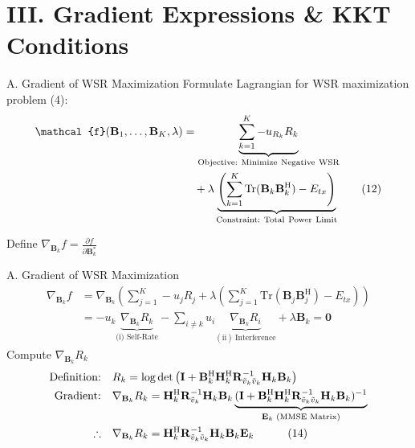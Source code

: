 \documentclass[aspectratio=169, 10pt]{beamer}
\begin{document}
\section{III. Gradient Expressions \& KKT Conditions}

\begin{frame}{A. Gradient of WSR Maximization}
    Formulate Lagrangian for WSR maximization problem (4):
    \begin{align}
        \mathcal{f}(\mathbf{B}_1, \dots, \mathbf{B}_K, \lambda)
         & = \underbrace{ \sum_{k=1}^{K} -u_{R_k} R_k }_{\mathrm{Objective:\ Minimize\ Negative\ WSR}} \notag \\
         & \quad + \lambda \underbrace{ \left(
            \sum_{k=1}^{K} \mathrm{Tr}(\mathbf{B}_k \mathbf{B}_k^\mathrm{H}) - E_{tx}
            \right) }_{\mathrm{Constraint:\ Total\ Power\ Limit}}
        \tag{12}
    \end{align}

    Define $\nabla_{\mathbf{B}_k} f = \frac{\partial f}{\partial \mathbf{B}_k^*}$

\end{frame}

\begin{frame}[label=main-wsr_Ri]{A. Gradient of WSR Maximization}
    \begin{align*}
        \nabla_{\mathbf{B}_k} f
         & = \nabla_{\mathbf{B}_k} \left( \sum_{j=1}^{K} -u_j R_j + \lambda \left( \sum_{j=1}^{K} \mathrm{Tr}(\mathbf{B}_j \mathbf{B}_j^\mathrm{H}) - E_{tx} \right) \right)                                          \\
         & = -u_k \underbrace{ \nabla_{\mathbf{B}_k} R_k }_{\textrm{(i)\ Self-Rate}} - \sum_{i \neq k} u_i \underbrace{ \nabla_{\mathbf{B}_k} R_i }_{\mathrm{(ii)\ Interference}} + \lambda \mathbf{B}_k = \mathbf{0}
    \end{align*}
    Compute $\nabla_{\mathbf{B}_k} R_k$
    \begin{align*}
        \textrm{Definition:} \quad
         & R_k = \log \det \left(\mathbf{I} + \mathbf{B}_k^\mathrm{H} \mathbf{H}_k^\mathrm{H} \mathbf{R}_{\tilde{v}_k\tilde{v}_k}^{-1} \mathbf{H}_k \mathbf{B}_k\right)\notag \\
        \textrm{Gradient:} \quad
         & \nabla_{\mathbf{B}_k} R_k =
        \mathbf{H}_k^\mathrm{H} \mathbf{R}_{\tilde{v}_k}^{-1} \mathbf{H}_k \mathbf{B}_k \underbrace{
        (\mathbf{I} + \mathbf{B}_k^\mathrm{H} \mathbf{H}_k^\mathrm{H} \mathbf{R}_{\tilde{v}_k\tilde{v}_k}^{-1} \mathbf{H}_k \mathbf{B}_k)^{-1} }
        _{\mathbf{E}_k \textrm{ (MMSE Matrix)}} \notag                                                                                                                        \\
        \therefore \quad
         & \nabla_{\mathbf{B}_k} R_k = \mathbf{H}_k^\mathrm{H} \mathbf{R}_{\tilde{v}_k\tilde{v}_k}^{-1} \mathbf{H}_k \mathbf{B}_k \mathbf{E}_k \quad
        \tag{14}
    \end{align*}
    \begin{flushright}
        \hyperlink{app-wsr_Ri}{}
    \end{flushright}
\end{frame}
\end{document}
